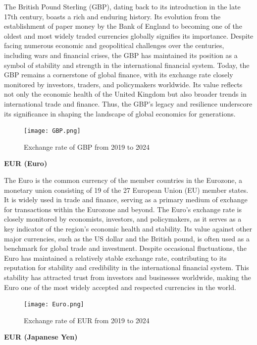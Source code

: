 \documentclass{ieeeojies}
\begin{document}
The British Pound Sterling (GBP), dating back to its introduction in the late 17th century, boasts a rich and enduring history. Its evolution from the establishment of paper money by the Bank of England to becoming one of the oldest and most widely traded currencies globally signifies its importance. Despite facing numerous economic and geopolitical challenges over the centuries, including wars and financial crises, the GBP has maintained its position as a symbol of stability and strength in the international financial system. Today, the GBP remains a cornerstone of global finance, with its exchange rate closely monitored by investors, traders, and policymakers worldwide. Its value reflects not only the economic health of the United Kingdom but also broader trends in international trade and finance. Thus, the GBP's legacy and resilience underscore its significance in shaping the landscape of global economics for generations.
\begin{figure}[h]
    \centering
    \texttt{[image: GBP.png]}
    \label{fig:us_image}
    \caption{Exchange rate of GBP from 2019 to 2024}
\end{figure}

\raggedright
\bigskip
\textbf{EUR (Euro)}
\bigskip

The Euro is the common currency of the member countries in the Eurozone, a monetary union consisting of 19 of the 27 European Union (EU) member states. It is widely used in trade and finance, serving as a primary medium of exchange for transactions within the Eurozone and beyond. The Euro's exchange rate is closely monitored by economists, investors, and policymakers, as it serves as a key indicator of the region's economic health and stability. Its value against other major currencies, such as the US dollar and the British pound, is often used as a benchmark for global trade and investment. Despite occasional fluctuations, the Euro has maintained a relatively stable exchange rate, contributing to its reputation for stability and credibility in the international financial system. This stability has attracted trust from investors and businesses worldwide, making the Euro one of the most widely accepted and respected currencies in the world.
\begin{figure}[h]
    \centering
    \texttt{[image: Euro.png]}
    \caption{Exchange rate of EUR from 2019 to 2024}
    \label{fig:euro_image}
\end{figure}


\bigskip
\textbf{EUR (Japanese Yen)}
\bigskip
\end{document}
